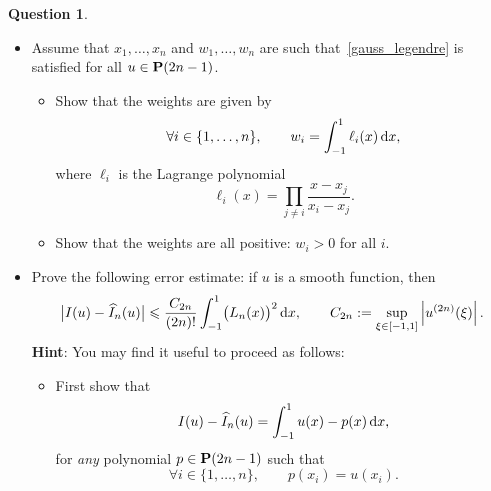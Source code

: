 \documentclass[11pt]{article}
\theoremstyle{definition}
\newtheorem{question}{Question}
\begin{document}
\begin{question}
\begin{itemize}
        \item
            Assume that $x_1, \dotsc, x_n$ and $w_1, \dotsc, w_n$ are such that~\eqref{gauss_legendre} is satisfied for all $u \in \mathbf P(2n-1)$.
            \begin{itemize}

                \item
                    Show that the weights are given by
                    \[
                        \forall i \in \{1, \dotsc, n\}, \qquad
                        w_i = \int_{-1}^{1} \ell_i(x) \, \mathrm d x,
                    \]
                    where $\ell_i$ is the Lagrange polynomial
                    \[
                        \ell_i(x) = \prod_{j \neq i} \frac{x - x_j}{x_i - x_j}.
                    \]

                \item
                    Show that the weights are all positive: $w_i > 0$ for all $i$.
            \end{itemize}

                \newpage
                \item
                     Prove the following error estimate:
                    if $u$ is a smooth function,
                    then
                    \[
                         \bigl\lvert I(u) - \widehat I_n(u) \bigr\rvert
                         \leqslant \frac{C_{2n}}{(2n)!}\int_{-1}^1 \bigl(L_n(x)\bigr)^2 \, \mathrm d x,
                         \qquad C_{2n} := \sup_{\xi \in [-1, 1]} \left\lvert u^{(2n)}(\xi) \right\rvert.
                    \]
                    \textbf{Hint}: You may find it useful to proceed as follows:
                    \begin{itemize}
                        \item
                            First show that
                            \begin{equation}
                                \label{eq:hermite_interpolation}
                                 I(u) - \widehat I_n(u)
                                = \int_{-1}^{1} u(x) - p(x) \, \mathrm d x,
                            \end{equation}
                            for \emph{any} polynomial $p \in \mathbf P(2n-1)$ such that
                            \[
                                \forall i \in \{1, \dotsc, n\}, \qquad
                                p(x_i) = u(x_i).
                            \]


\end{itemize}
\end{itemize}
\end{question}
\end{document}
